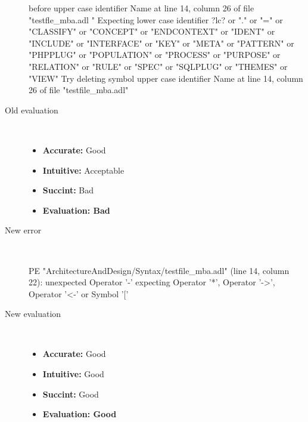 \begin{description}
\begin{haskell}
before upper case identifier Name at line 14, column 26 of file "testfle_mba.adl
" Expecting lower case identifier ?lc? or "." or "=" or "CLASSIFY" or "CONCEPT" or  "ENDCONTEXT" or "IDENT" or "INCLUDE" or "INTERFACE" or "KEY" or "META" or "PATTERN" or "PHPPLUG" or "POPULATION" or "PROCESS" or "PURPOSE" or "RELATION" or "RULE" or "SPEC" or "SQLPLUG" or "THEMES" or "VIEW"
Try deleting symbol upper case identifier Name at line 14, column 26 of file "testfile_mba.adl"\end{haskell}
  \item[Old evaluation]~\\
    \begin{itemize}
    \item \textbf{Accurate:} Good
    \item \textbf{Intuitive:} Acceptable
    \item \textbf{Succint:} Bad
    \item \textbf{Evaluation: Bad}
    \end{itemize}
  \item[New error]~\\
\begin{haskell}
PE "ArchitectureAndDesign/Syntax/testfile_mba.adl" (line 14, column 22):
unexpected Operator '-'
expecting Operator '*', Operator '->', Operator '<-' or Symbol '['\end{haskell}
  \item[New evaluation]~\\
    \begin{itemize}
    \item \textbf{Accurate:} Good
    \item \textbf{Intuitive:} Good
    \item \textbf{Succint:} Good
    \item \textbf{Evaluation: Good
}
    \end{itemize}
  \end{description}

\hrulefill

